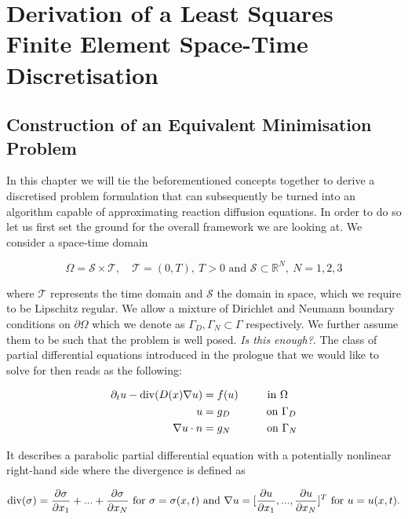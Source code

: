 \documentclass[../draft_1.tex]{subfiles}
\begin{document}
\chapter{Derivation of a  Least Squares Finite Element Space-Time Discretisation}
\section{Construction of an Equivalent Minimisation Problem}

In this chapter we will tie the beforementioned concepts together to derive a discretised problem formulation that can subsequently be turned into an algorithm capable of approximating reaction diffusion equations. In order to do so let us first set the ground for the overall framework we are looking at. We consider a space-time domain 
\begin{ceqn}
\begin{equation}
\Omega = \mathcal{S} \times \mathcal{T}, \quad \mathcal{T} = (0,T), \ T>0 \text{ and }  \mathcal{S} \subset \mathbb{R}^N, \ N = 1,2,3
\end{equation} 
\end{ceqn}
where $\mathcal{T} $ represents the time domain and $ \mathcal{S}$ the domain in space, which we require to be Lipschitz regular. We allow a mixture of Dirichlet and Neumann boundary conditions on $\partial \Omega$ which we denote as $\Gamma_D, \Gamma_N \subset \Gamma$ respectively. We further assume them to be such that the problem is well posed. \textit{Is this enough?}.  The class of partial differential equations introduced in the prologue that we would like to solve for then reads as the following:
\begin{ceqn}
\begin{align}
\begin{aligned}
\label{strong_form}
\partial_t u - \mathop{}\!\mathrm{div} (D(x) \nabla u) &= f(u) \qquad \  \text{ in } \Omega \\
u &= g_D \quad \qquad \text{ on } \Gamma_D \\
\nabla u \cdot n &= g_N \quad \qquad \text{ on } \Gamma_N
\end{aligned}
\end{align}
\end{ceqn}
It describes a parabolic partial differential equation with a potentially nonlinear right-hand side where the divergence is defined as 
\begin{ceqn}
	\begin{align*}
\begin{aligned}
\mathop{}\!\mathrm{div}(\sigma) = \frac{\partial \sigma}{\partial x_1} + ... + \frac{\partial \sigma}{\partial x_N} \text{  for } \sigma = \sigma(x,t) \text{ and } \nabla u = [\frac{\partial u}{\partial x_1}, ..., \frac{\partial u}{\partial x_N} ]^T \text{  for } u = u(x,t). 
\end{aligned}
\end{align*}
\end{ceqn}
\end{document}
